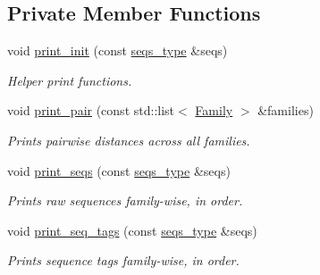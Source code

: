 \subsection*{Private Member Functions}
\textbf{ }\par
\begin{DoxyCompactItemize}
\item 
void \mbox{\hyperlink{classrcombinator_1_1Output_a365f66ac8299882ebfd6239d4c90b1bb}{print\+\_\+init}} (const \mbox{\hyperlink{classrcombinator_1_1Output_a2b29321fb770a4678d423ceb0e04ebaa}{seqs\+\_\+type}} \&seqs)
\begin{DoxyCompactList}\small\item\em Helper print functions. \end{DoxyCompactList}\item 
void \mbox{\hyperlink{classrcombinator_1_1Output_ac5632b57357788ba7d25769c412a2a11}{print\+\_\+pair}} (const std\+::list$<$ \mbox{\hyperlink{classrcombinator_1_1Family}{Family}} $>$ \&families)
\begin{DoxyCompactList}\small\item\em Prints pairwise distances across all families. \end{DoxyCompactList}\item 
\mbox{\label{classrcombinator_1_1Output_ac56d04591e50cbb8170da04a5ffa233a}} 
void \mbox{\hyperlink{classrcombinator_1_1Output_ac56d04591e50cbb8170da04a5ffa233a}{print\+\_\+seqs}} (const \mbox{\hyperlink{classrcombinator_1_1Output_a2b29321fb770a4678d423ceb0e04ebaa}{seqs\+\_\+type}} \&seqs)
\begin{DoxyCompactList}\small\item\em Prints raw sequences family-\/wise, in order. \end{DoxyCompactList}\item 
\mbox{\label{classrcombinator_1_1Output_a89392e3e01808946eaeb160955e87b21}} 
void \mbox{\hyperlink{classrcombinator_1_1Output_a89392e3e01808946eaeb160955e87b21}{print\+\_\+seq\+\_\+tags}} (const \mbox{\hyperlink{classrcombinator_1_1Output_a2b29321fb770a4678d423ceb0e04ebaa}{seqs\+\_\+type}} \&seqs)
\begin{DoxyCompactList}\small\item\em Prints sequence tags family-\/wise, in order. \end{DoxyCompactList}\end{DoxyCompactItemize}

